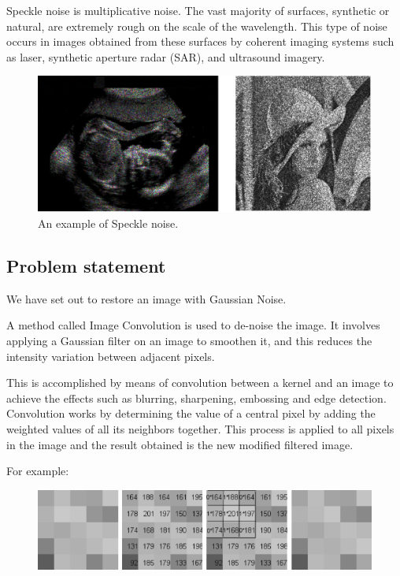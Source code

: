 \documentclass[paper=a4, fontsize=11pt]{scrartcl} %
\numberwithin{equation}{section} %
\numberwithin{figure}{section} %
\numberwithin{table}{section} %
\begin{document}
\begin{enumerate}
  Speckle noise is multiplicative noise. The vast majority of surfaces, synthetic or natural, are extremely rough on the scale of the wavelength. This type of noise occurs in images obtained from these surfaces by coherent imaging systems such as laser, synthetic aperture radar (SAR), and ultrasound imagery.
  \begin{figure}[H]
	\centering
	\includegraphics[scale=0.3]{"speckle"}
        \caption{An example of Speckle noise.}
        \label{speckle}
  \end{figure}
\end{enumerate}
  
\subsection{Problem statement}
We have set out to restore an image with Gaussian Noise.

A method called Image Convolution is used to de-noise the image. It involves applying a Gaussian filter on an image to smoothen it, and this reduces the intensity variation between adjacent pixels.

 This is accomplished by means of convolution between a kernel and an image to achieve the effects such as blurring, sharpening, embossing and edge detection.
 Convolution works by determining the value of a central pixel by adding the weighted values of all its neighbors together. This process is applied to all pixels in the image and the result obtained is the new modified filtered image.

For example:
 
\begin{figure}[H]
	\centering
	\includegraphics[scale=0.5]{"greyscale"}
        \label{greyscale}
\end{figure}
 
\end{document}

